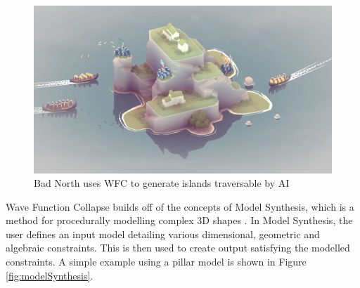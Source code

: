 \begin{figure}[H]
    \centering
    \includegraphics[width=\textwidth, height=0.3\textheight, keepaspectratio]{Images/BadNorth.jpg}
    \caption{Bad North uses WFC to generate islands traversable by AI \cite{badnorth}}
    \label{fig:badNorth}
\end{figure}

Wave Function Collapse builds off of the concepts of Model Synthesis, which is a method for procedurally modelling complex 3D shapes \cite{model_synthesis, model_synthesis_diss}. In Model Synthesis, the user defines an input model detailing various dimensional, geometric and algebraic constraints. This is then used to create output satisfying the modelled constraints. A simple example using a pillar model is shown in Figure \ref{fig:modelSynthesis}.

